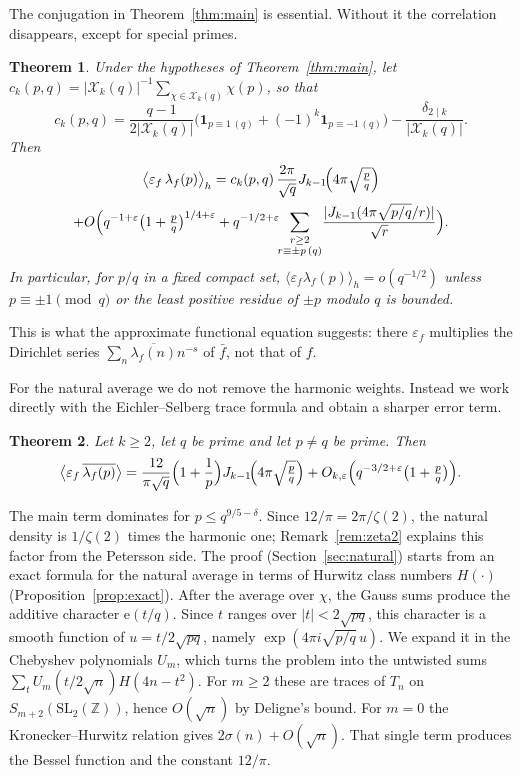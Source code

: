 \documentclass[11pt]{amsart}
\newtheorem{theorem}{Theorem}
\theoremstyle{remark}
\newcommand{\eps}{\varepsilon}
\newcommand{\e}{\mathrm{e}}
\newcommand{\cX}{\mathcal{X}}
\newcommand{\ov}{\overline}
\newcommand{\SL}{\mathrm{SL}_2(\mathbb Z)}
\begin{document}
The conjugation in Theorem~\ref{thm:main} is essential. Without it the correlation disappears, except for special primes.

\begin{theorem}\label{thm:unconj}
Under the hypotheses of Theorem~\ref{thm:main}, let $c_k(p,q)=|\cX_k(q)|^{-1}\sum_{\chi\in\cX_k(q)}\chi(p)$, so that
\[
c_k(p,q)=\frac{q-1}{2|\cX_k(q)|}\bigl(\mathbf 1_{p\equiv1\,(q)}+(-1)^k\mathbf 1_{p\equiv-1\,(q)}\bigr)-\frac{\delta_{2\mid k}}{|\cX_k(q)|}.
\]
Then
\begin{multline*}
\bigl\langle \eps_f\,\lambda_f(p)\bigr\rangle_h=c_k(p,q)\,\frac{2\pi}{\sqrt q}J_{k-1}\!\Bigl(4\pi\sqrt{\tfrac pq}\Bigr)\\
+O\Bigl(q^{-1+\varepsilon}\bigl(1+\tfrac pq\bigr)^{1/4+\varepsilon}+q^{-1/2+\varepsilon}\!\!\sum_{\substack{r\ge2\\ r\equiv\pm p\,(q)}}\!\frac{|J_{k-1}(4\pi\sqrt{p/q}/r)|}{\sqrt r}\Bigr).
\end{multline*}
In particular, for $p/q$ in a fixed compact set, $\langle\eps_f\lambda_f(p)\rangle_h=o(q^{-1/2})$ unless $p\equiv\pm1\pmod q$ or the least positive residue of $\pm p$ modulo $q$ is bounded.
\end{theorem}

This is what the approximate functional equation suggests: there $\eps_f$ multiplies the Dirichlet series $\sum_n\ov{\lambda_f(n)}n^{-s}$ of $\bar f$, not that of $f$.

For the natural average we do not remove the harmonic weights. Instead we work directly with the Eichler--Selberg trace formula and obtain a sharper error term.

\begin{theorem}\label{thm:natural}
Let $k\ge2$, let $q$ be prime and let $p\ne q$ be prime. Then
\[
\bigl\langle \eps_f\,\ov{\lambda_f(p)}\bigr\rangle=\frac{12}{\pi\sqrt q}\Bigl(1+\frac1p\Bigr)J_{k-1}\!\Bigl(4\pi\sqrt{\tfrac pq}\Bigr)+O_{k,\varepsilon}\Bigl(q^{-3/2+\varepsilon}\bigl(1+\tfrac pq\bigr)\Bigr).
\]
\end{theorem}

The main term dominates for $p\le q^{9/5-\delta}$. Since $12/\pi=2\pi/\zeta(2)$, the natural density is $1/\zeta(2)$ times the harmonic one; Remark~\ref{rem:zeta2} explains this factor from the Petersson side. The proof (Section~\ref{sec:natural}) starts from an exact formula for the natural average in terms of Hurwitz class numbers $H(\cdot)$ (Proposition~\ref{prop:exact}). After the average over $\chi$, the Gauss sums produce the additive character $\e(t/q)$. Since $t$ ranges over $|t|<2\sqrt{pq}$, this character is a smooth function of $u=t/2\sqrt{pq}$, namely $\exp(4\pi i\sqrt{p/q}\,u)$. We expand it in the Chebyshev polynomials $U_m$, which turns the problem into the untwisted sums $\sum_tU_m(t/2\sqrt n)H(4n-t^2)$. For $m\ge2$ these are traces of $T_n$ on $S_{m+2}(\SL)$, hence $O(\sqrt n)$ by Deligne's bound. For $m=0$ the Kronecker--Hurwitz relation gives $2\sigma(n)+O(\sqrt n)$. That single term produces the Bessel function and the constant $12/\pi$.
\end{document}
